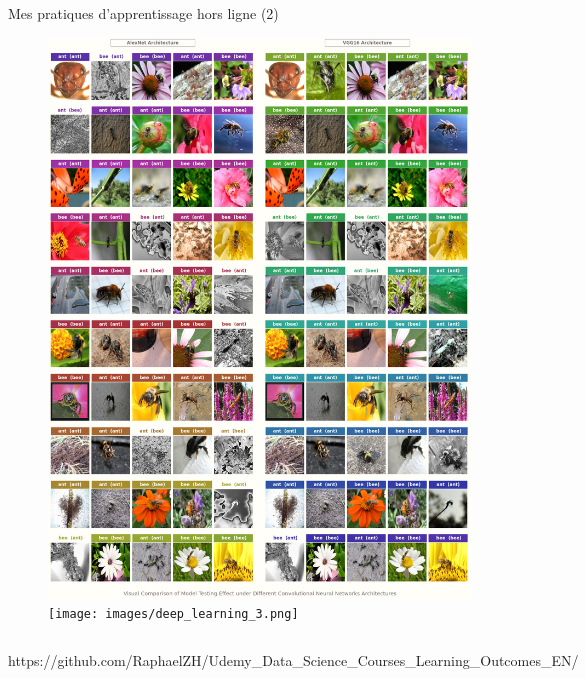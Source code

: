 \documentclass{beamer}
\begin{document}
\begin{frame}[fragile]{Mes pratiques d'apprentissage hors ligne (2)}
\begin{figure}[!htb]
			\centering\includegraphics[width=\linewidth]{images/deep_learning_2.png}
			\endminipage\hfill
			\centering\texttt{[image: images/deep\_learning\_3.png]}
			\endminipage
		\end{figure}
		\vspace{-.4em}
		\begin{columns}
			\normalfont\footnotesize{https://github.com/RaphaelZH/Udemy\_Data\_Science\_Courses\_Learning\_Outcomes\_EN/}
		\end{columns}
	\end{frame}
	
\end{document}
